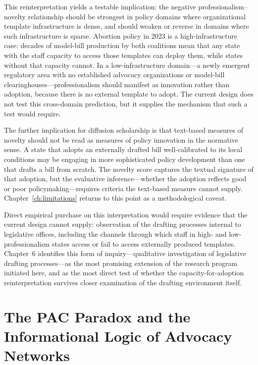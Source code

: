 This reinterpretation yields a testable implication: the negative professionalism--novelty relationship should be strongest in policy domains where organizational template infrastructure is dense, and should weaken or reverse in domains where such infrastructure is sparse. Abortion policy in 2023 is a high-infrastructure case: decades of model-bill production by both coalitions mean that any state with the staff capacity to access those templates can deploy them, while states without that capacity cannot. In a low-infrastructure domain—a newly emergent regulatory area with no established advocacy organizations or model-bill clearinghouses—professionalism should manifest as innovation rather than adoption, because there is no external template to adopt. The current design does not test this cross-domain prediction, but it supplies the mechanism that such a test would require.

The further implication for diffusion scholarship is that text-based measures of novelty should not be read as measures of policy innovation in the normative sense. A state that adopts an externally drafted bill well-calibrated to its local conditions may be engaging in more sophisticated policy development than one that drafts a bill from scratch. The novelty score captures the textual signature of that adoption, but the evaluative inference---whether the adoption reflects good or poor policymaking---requires criteria the text-based measure cannot supply. Chapter~\ref{ch:limitations} returns to this point as a methodological caveat.

Direct empirical purchase on this interpretation would require evidence that the current design cannot supply: observation of the drafting processes internal to legislative offices, including the channels through which staff in high- and low-professionalism states access or fail to access externally produced templates. Chapter~6 identifies this form of inquiry---qualitative investigation of legislative drafting processes---as the most promising extension of the research program initiated here, and as the most direct test of whether the capacity-for-adoption reinterpretation survives closer examination of the drafting environment itself.

\section{The PAC Paradox and the Informational Logic of Advocacy Networks}
\label{sec:pac_paradox-discussion}

